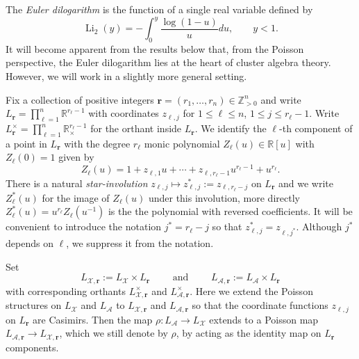 \documentclass{amsart}
\numberwithin{equation}{section}
\newcommand{\bfr}{{\boldsymbol{r}}}
\newcommand{\cA}{\mathcal{A}}
\newcommand{\cX}{\mathcal{X}}
\newcommand{\RR}{\mathbb{R}}
\newcommand{\ZZ}{\mathbb{Z}}
\newcommand{\Li}{\operatorname{Li}}
\begin{document}
The \emph{Euler dilogarithm} is the function of a single real variable defined by
\[\Li_2(y)=-\int_0^y \frac{\log(1-u)}{u}du,\qquad y<1.\]
It will become apparent from the results below that, from the Poisson perspective, the Euler dilogarithm lies at the heart of cluster algebra theory.
However, we will work in a slightly more general setting.

Fix a collection of positive integers $\bfr=(r_1,\ldots,r_n)\in\ZZ_{>0}^n$ and write $L_\bfr=\prod_{\ell=1}^n \RR^{r_\ell-1}$ with coordinates $z_{\ell,j}$ for $1\le\ell\le n$, $1\le j\le r_\ell-1$.
Write $L^\times_\bfr=\prod_{\ell=1}^n \RR_\times^{r_\ell-1}$ for the orthant inside $L_\bfr$.
We identify the $\ell$-th component of a point in $L_\bfr$ with the degree $r_\ell$ monic polynomial $Z_\ell(u)\in\RR[u]$ with $Z_\ell(0)=1$ given by
\begin{equation} \label{eq:gen mut poly}
Z_\ell(u)=1+z_{\ell,1}u+\cdots+z_{\ell,r_\ell-1}u^{r_\ell-1}+u^{r_\ell}.
\end{equation}
There is a natural \emph{star-involution} $z_{\ell,j}\mapsto z^*_{\ell,j}:=z_{\ell,r_\ell-j}$ on $L_\bfr$ and we write $Z^*_\ell(u)$ for the image of $Z_\ell(u)$ under this involution, more directly $Z^*_\ell(u)=u^{r_\ell} Z_\ell(u^{-1})$ is the the polynomial with reversed coefficients.
It will be convenient to introduce the notation $j^*=r_\ell-j$ so that $z^*_{\ell,j}=z_{\ell,j^*}$.
Although $j^*$ depends on $\ell$, we suppress it from the notation.

Set 
\[L_{\cX,\bfr}:=L_\cX\times L_\bfr\qquad\text{ and }\qquad L_{\cA,\bfr}:=L_\cA\times L_\bfr\]
with corresponding orthants $L^\times_{\cX,\bfr}$ and $L^\times_{\cA,\bfr}$.
Here we extend the Poisson structures on $L_\cX$ and $L_\cA$ to $L_{\cX,\bfr}$ and $L_{\cA,\bfr}$ so that the coordinate functions $z_{\ell,j}$ on $L_\bfr$ are Casimirs. 
Then the map $\rho:L_\cA\to L_\cX$ extends to a Poisson map $L_{\cA,\bfr}\to L_{\cX,\bfr}$, which we still denote by $\rho$, by acting as the identity map on $L_\bfr$ components.
\end{document}
